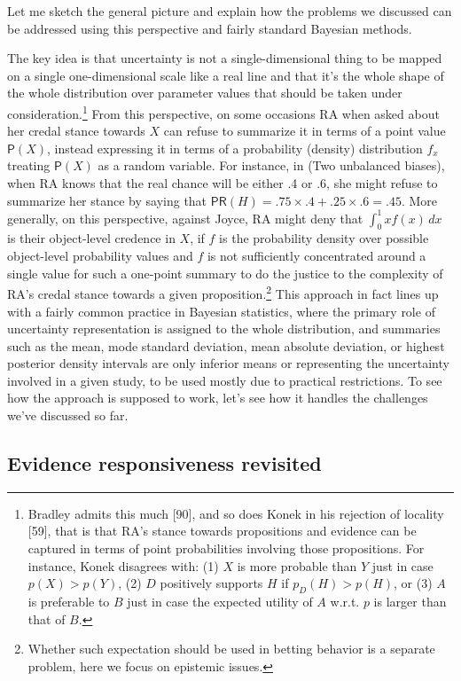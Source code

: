 \documentclass[
  10pt,
  dvipsnames,enabledeprecatedfontcommands]{scrartcl}
\begin{document}
Let me sketch the general picture and explain how the problems we
discussed can be addressed using this perspective and fairly standard
Bayesian methods.

The key idea is that uncertainty is not a single-dimensional thing to be
mapped on a single one-dimensional scale like a real line and that it's
the whole shape of the whole distribution over parameter values that
should be taken under
consideration.\footnote{Bradley admits this much [90], and so does  Konek in his rejection of locality [59], that is that RA's stance towards propositions and evidence can be captured in terms of point probabilities involving those propositions. For instance, Konek disagrees with: (1)  $X$ is more probable than $Y$ just in case $p(X)>p(Y)$, (2)  $D$ positively supports $H$ if $p_D(H)> p(H)$, or (3)  $A$ is preferable to $B$ just in case the expected utility of $A$ w.r.t. $p$ is larger than that of $B$.}
From this perspective, on some occasions RA when asked about her credal
stance towards \(X\) can refuse to summarize it in terms of a point
value \(\mathsf{P}(X)\), instead expressing it in terms of a probability
(density) distribution \(f_x\) treating \(\mathsf{P}(X)\) as a random
variable. For instance, in (Two unbalanced biases), when RA knows that
the real chance will be either .4 or .6, she might refuse to summarize
her stance by saying that
\(\mathsf{PR}(H) = .75 \times .4 + .25 \times .6 = .45\). More
generally, on this perspective, against Joyce, RA might deny that
\(\int_{0}^{1} x f(x) \, dx\) is their object-level credence in \(X\),
if \(f\) is the probability density over possible object-level
probability values and \(f\) is not sufficiently concentrated around a
single value for such a one-point summary to do the justice to the
complexity of RA's credal stance towards a given proposition.\footnote{Whether
  such expectation should be used in betting behavior is a separate
  problem, here we focus on epistemic issues.} This approach in fact
lines up with a fairly common practice in Bayesian statistics, where the
primary role of uncertainty representation is assigned to the whole
distribution, and summaries such as the mean, mode standard deviation,
mean absolute deviation, or highest posterior density intervals are only
inferior means or representing the uncertainty involved in a given
study, to be used mostly due to practical restrictions. To see how the
approach is supposed to work, let's see how it handles the challenges
we've discussed so far.

\hypertarget{evidence-responsiveness-revisited}{%
\subsection{Evidence responsiveness
revisited}\label{evidence-responsiveness-revisited}}
\end{document}
